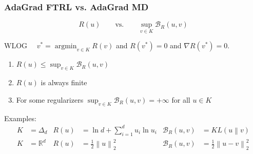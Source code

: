 \documentclass[usenames,dvipsnames]{beamer}
\DeclareMathOperator*{\argmin}{argmin}
\newcommand{\R}{\mathbb{R}}
\newcommand{\norm}[1]{\left\|#1\right\|}
\newcommand{\KL}[2]{KL\left({#1}\middle\|{#2}\right)}
\newcommand{\grad}{\nabla}
\newcommand{\Breg}{\mathcal{B}}
\begin{document}
\begin{frame}
\frametitle{AdaGrad FTRL vs. AdaGrad MD}

$$
R(u) \qquad \text{vs.} \qquad \sup_{v \in K}\Breg_{R}(u,v)
$$

\vspace{0.5cm}

WLOG \ \ $v^* = \argmin_{v \in K} R(v)$ and $R(v^*) = 0$ and $\grad R(v^*) = 0$.

\vspace{0.5cm}

\everymath{\displaystyle}
\begin{enumerate}
\item $R(u) \le \sup_{v \in K} \Breg_{R}(u,v)$
\item $R(u)$ is always finite
\item For some regularizers $\sup_{v \in K} \Breg_{R}(u,v) = + \infty$ for all $u \in K$
\end{enumerate}

Examples:
\begin{align*}
K & = \Delta_d & R(u) & = \ln d + \sum_{i=1}^d u_i \ln u_i  & \Breg_R(u,v) & = \KL{u}{v} \\
K & = \R^d & R(u) & = \frac{1}{2}\norm{u}_2^2  & \Breg_R(u,v) & = \frac{1}{2} \norm{u - v}_2^2 \\
\end{align*}

\end{frame}
\end{document}
